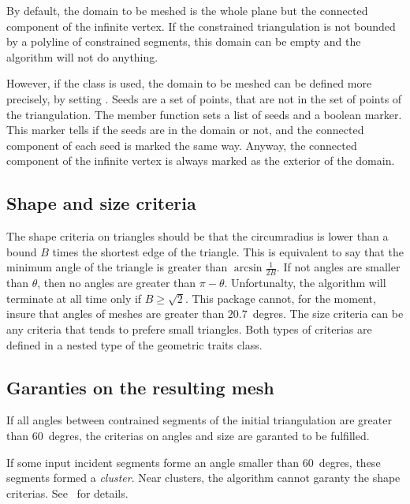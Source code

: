 By default, the domain to be meshed is the whole plane but the connected
component of the infinite vertex. If the constrained triangulation is not
bounded by a polyline of constrained segments, this domain can be empty and
the algorithm will not do anything.

However, if the class  is used, the domain to be
meshed can be defined more precisely, by setting . Seeds are
a set of points, that are not in the set of points of the
triangulation. The member function  sets a
list of seeds and a boolean marker. This marker tells if the seeds are in
the domain or not, and the connected component of each seed is marked the
same way. Anyway, the connected component of the infinite vertex is always
marked as the exterior of the domain.

\subsection{Shape and size criteria}

The shape criteria on triangles should be that the circumradius is
lower than a bound $B$ times the shortest edge of the triangle. This is
equivalent to say that the minimum angle of the triangle is greater
than $\arcsin{\frac{1}{2B}}$. If not angles are smaller than $\theta$,
then no angles are greater than $\pi - \theta$. Unfortunalty, the
algorithm will terminate at all time only if $B \ge \sqrt{2}$. This
package cannot, for the moment, insure that angles of meshes are
greater than $20.7$~degres. The size criteria can be any criteria
that tends to prefere small triangles. Both types of criterias are
defined in a nested type  of the geometric traits class.

\subsection{Garanties on the resulting mesh}

If all angles between contrained segments of the initial triangulation are
greater than $60$~degres, the criterias on angles and size are garanted to
be fulfilled.

If some input incident segments forme an angle smaller than $60$~degres,
these segments formed a \textit{cluster}. Near clusters, the algorithm
cannot garanty the shape criterias. See~\cite{s-mgdsa-00} for details.

